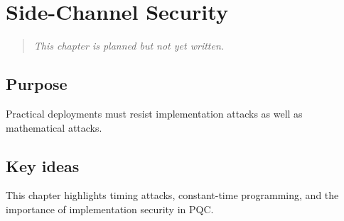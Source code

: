 \chapter{Side-Channel Security}

\begin{quote}
\textit{This chapter is planned but not yet written.}
\end{quote}

\section{Purpose}
Practical deployments must resist implementation attacks as well as mathematical attacks.
\section{Key ideas}
This chapter highlights timing attacks, constant-time programming, and the importance of implementation security in PQC.
